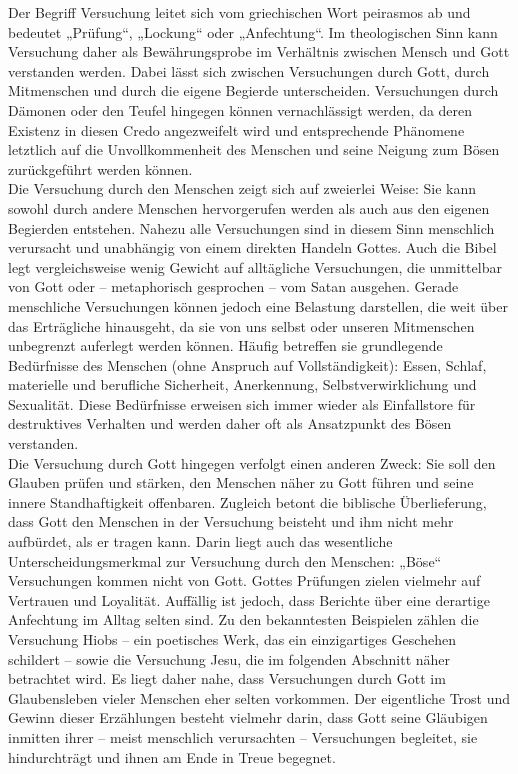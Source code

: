 Der Begriff Versuchung leitet sich vom griechischen Wort peirasmos ab und bedeutet „Prüfung“, „Lockung“ oder „Anfechtung“. Im theologischen Sinn kann Versuchung daher als Bewährungsprobe im Verhältnis zwischen Mensch und Gott verstanden werden. Dabei lässt sich zwischen Versuchungen durch Gott, durch Mitmenschen und durch die eigene Begierde unterscheiden. Versuchungen durch Dämonen oder den Teufel hingegen können vernachlässigt werden, da deren Existenz in diesen Credo angezweifelt wird und entsprechende Phänomene letztlich auf die Unvollkommenheit des Menschen und seine Neigung zum Bösen zurückgeführt werden können. \\

Die Versuchung durch den Menschen zeigt sich auf zweierlei Weise: Sie kann sowohl durch andere Menschen hervorgerufen werden als auch aus den eigenen Begierden entstehen. Nahezu alle Versuchungen sind in diesem Sinn menschlich verursacht und unabhängig von einem direkten Handeln Gottes. Auch die Bibel legt vergleichsweise wenig Gewicht auf alltägliche Versuchungen, die unmittelbar von Gott oder – metaphorisch gesprochen – vom Satan ausgehen. Gerade menschliche Versuchungen können jedoch eine Belastung darstellen, die weit über das Erträgliche hinausgeht, da sie von uns selbst oder unseren Mitmenschen unbegrenzt auferlegt werden können. Häufig betreffen sie grundlegende Bedürfnisse des Menschen (ohne Anspruch auf Vollständigkeit): Essen, Schlaf, materielle und berufliche Sicherheit, Anerkennung, Selbstverwirklichung und Sexualität. Diese Bedürfnisse erweisen sich immer wieder als Einfallstore für destruktives Verhalten und werden daher oft als Ansatzpunkt des Bösen verstanden.\\

Die Versuchung durch Gott hingegen verfolgt einen anderen Zweck: Sie soll den Glauben prüfen und stärken, den Menschen näher zu Gott führen und seine innere Standhaftigkeit offenbaren. Zugleich betont die biblische Überlieferung, dass Gott den Menschen in der Versuchung beisteht und ihm nicht mehr aufbürdet, als er tragen kann. Darin liegt auch das wesentliche Unterscheidungsmerkmal zur Versuchung durch den Menschen: „Böse“ Versuchungen kommen nicht von Gott. Gottes Prüfungen zielen vielmehr auf Vertrauen und Loyalität. Auffällig ist jedoch, dass Berichte über eine derartige Anfechtung im Alltag selten sind. Zu den bekanntesten Beispielen zählen die Versuchung Hiobs – ein poetisches Werk, das ein einzigartiges Geschehen schildert – sowie die Versuchung Jesu, die im folgenden Abschnitt näher betrachtet wird. Es liegt daher nahe, dass Versuchungen durch Gott im Glaubensleben vieler Menschen eher selten vorkommen. Der eigentliche Trost und Gewinn dieser Erzählungen besteht vielmehr darin, dass Gott seine Gläubigen inmitten ihrer – meist menschlich verursachten – Versuchungen begleitet, sie hindurchträgt und ihnen am Ende in Treue begegnet.

